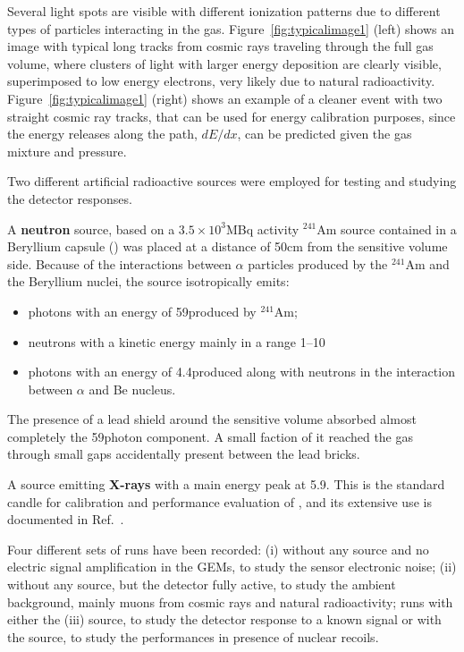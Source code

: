 \documentclass[12pt]{iopart}
\begin{document}
Several light spots are visible with different ionization patterns due
to different types of particles interacting in the gas.
Figure~\ref{fig:typicalimage1} (left) shows an image with typical long
tracks from cosmic rays traveling through the full gas volume, where
clusters of light with larger energy deposition are clearly visible,
superimposed to low energy electrons, very likely due to natural
radioactivity.  Figure~\ref{fig:typicalimage1} (right) shows an
example of a cleaner event with two straight cosmic ray tracks, that
can be used for energy calibration purposes, since the energy releases
along the path, $dE/dx$, can be predicted given the gas mixture and
pressure.

Two different artificial radioactive sources were employed for testing
and studying the detector responses.

\vspace{10pt}

A {\bf neutron} source, based on a $3.5{\times}10^3$\unit{MBq} activity
$^{241}$Am source contained in a Beryllium capsule (\ambe) was placed
at a distance of 50\unit{cm} from the sensitive volume side.  Because
of the interactions between $\alpha$ particles produced by the
$^{241}$Am and the Beryllium nuclei, the \ambe source isotropically
emits:
 \begin{itemize}
     \item photons with an energy of 59\keV produced by $^{241}$Am;
     \item neutrons with a kinetic energy mainly in a range
       1--10\MeV
     \item photons with an energy of 4.4\MeV produced along with
       neutrons in the interaction between $\alpha$ and Be nucleus.
 \end{itemize}
 The presence of a lead shield around the sensitive volume absorbed
almost completely the 59\keV photon component. A small faction of it
reached the gas through small gaps accidentally present between the lead
bricks.

\vspace{10pt}

A \fe source emitting {\bf X-rays} with a main energy peak at 5.9\keV.
This is the standard candle for calibration and performance evaluation
of \lemon, and its extensive use is documented in
Ref.~\cite{bib:fe55}.

\vspace{10pt}

Four different sets of runs have been recorded: (i) without any source
and no electric signal amplification in the GEMs, to study the sensor
electronic noise; (ii) without any source, but the detector fully
active, to study the ambient background, mainly muons from cosmic rays
and natural radioactivity; runs with either the (iii) \fe source, to
study the detector response to a known signal or with the \ambe
source, to study the \lemon performances in presence of nuclear
recoils.
\end{document}
